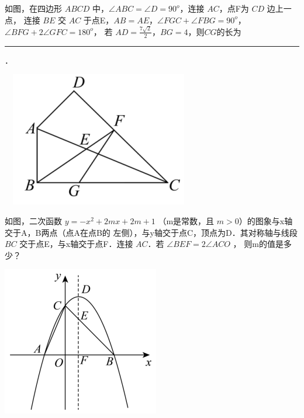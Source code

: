 \documentclass[12pt, a4paper, addpoints]{exam} %
\begin{document}
\vspace{10pt}



\begingroup{} %

\begin{questions}


\question[10] 如图，在四边形 $ABCD$ 中，$\angle{ABC}=\angle{D}=90^{o}$，连接 $AC$，点F为 $CD$ 边上一点，
连接 $BE$ 交 $AC$ 于点E，$AB=AE$，$\angle{FGC}+\angle{FBG}=90^{o}$，$\angle{BFG}+2\angle{GFC}=180^{o}$，
若 $AD=\frac{7\sqrt{2}}{2}$，$BG=4$，则$CG$的长为 \rule{3cm}{0.4pt}．

\ \ 
\includegraphics[scale=1]{2222.png}
\vspace{6cm}




\question[15] 如图，二次函数 $y=-x^2+2mx+2m+1 $ （m是常数，且 $m>0$）的图象与x轴交于A，B两点（点A在点B的
左侧），与y轴交于点C，顶点为D．其对称轴与线段 $BC$ 交于点E，与x轴交于点F．连接 $AC$．若 $\angle{BEF}=2\angle{ACO}$ ，
则m的值是多少？

\includegraphics[scale=1]{1111.png}
\vspace{6cm}



\end{questions}
\end{document}
